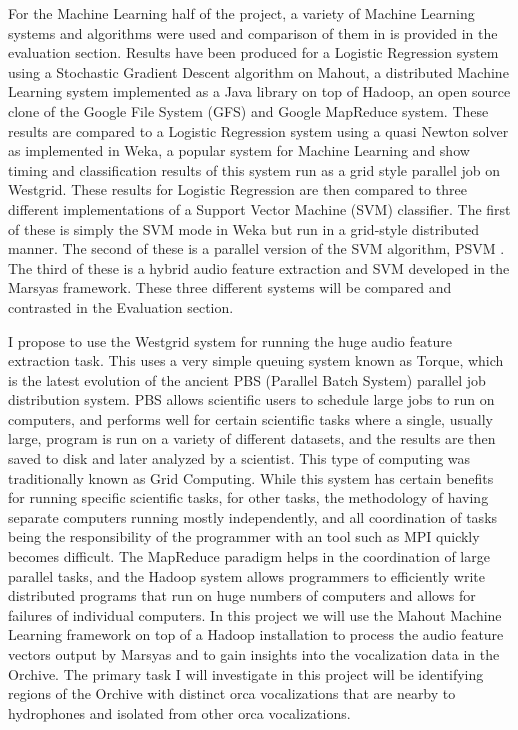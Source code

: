 For the Machine Learning half of the project, a variety of Machine
Learning systems and algorithms were used and comparison of them in is
provided in the evaluation section.  Results have been produced for a
Logistic Regression system using a Stochastic Gradient Descent
algorithm on Mahout, a distributed Machine Learning system implemented
as a Java library on top of Hadoop, an open source clone of the Google
File System (GFS) and Google MapReduce system.  These results are
compared to a Logistic Regression system using a quasi Newton solver
as implemented in Weka, a popular system for Machine Learning and show
timing and classification results of this system run as a grid style
parallel job on Westgrid.  These results for Logistic Regression are
then compared to three different implementations of a Support Vector
Machine (SVM) classifier.  The first of these is simply the SVM mode
in Weka but run in a grid-style distributed manner.  The second of
these is a parallel version of the SVM algorithm, PSVM
\cite{chang07psvm}.  The third of these is a hybrid audio feature
extraction and SVM developed in the Marsyas framework.  These three
different systems will be compared and contrasted in the Evaluation
section.

I propose to use the Westgrid system for running the huge audio
feature extraction task. This uses a very simple queuing system known
as Torque, which is the latest evolution of the ancient PBS (Parallel
Batch System) parallel job distribution system. PBS allows scientific
users to schedule large jobs to run on computers, and performs well
for certain scientific tasks where a single, usually large, program is
run on a variety of different datasets, and the results are then saved
to disk and later analyzed by a scientist. This type of computing was
traditionally known as Grid Computing.  While this system has certain
benefits for running specific scientific tasks, for other tasks, the
methodology of having separate computers running mostly independently,
and all coordination of tasks being the responsibility of the
programmer with an tool such as MPI quickly becomes difficult. The
MapReduce paradigm helps in the coordination of large parallel tasks,
and the Hadoop system allows programmers to efficiently write
distributed programs that run on huge numbers of computers and allows
for failures of individual computers. In this project we will use the
Mahout Machine Learning framework on top of a Hadoop installation to
process the audio feature vectors output by Marsyas and to gain
insights into the vocalization data in the Orchive. The primary task I
will investigate in this project will be identifying regions of the
Orchive with distinct orca vocalizations that are nearby to
hydrophones and isolated from other orca vocalizations.

